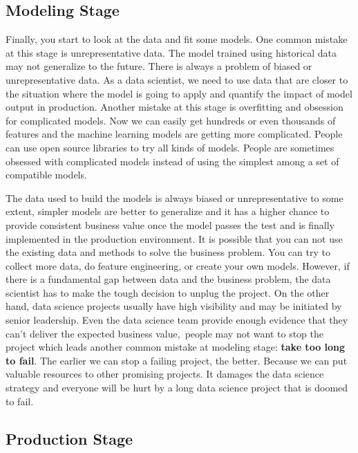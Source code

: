 \documentclass[12pt,]{krantz}
\theoremstyle{definition}
\theoremstyle{definition}
\theoremstyle{definition}
\theoremstyle{remark}
\begin{document}
\subsection{Modeling Stage}\label{modeling-stage}

Finally, you start to look at the data and fit some models. One common
mistake at this stage is unrepresentative data. The model trained using
historical data may not generalize to the future. There is always a
problem of biased or unrepresentative data. As a data scientist, we need
to use data that are closer to the situation where the model is going to
apply and quantify the impact of model output in production. Another
mistake at this stage is overfitting and obsession for complicated
models. Now we can easily get hundreds or even thousands of features and
the machine learning models are getting more complicated. People can use
open source libraries to try all kinds of models. People are sometimes
obsessed with complicated models instead of using the simplest among a
set of compatible models.

The data used to build the models is always biased or unrepresentative
to some extent, simpler models are better to generalize and it has a
higher chance to provide consistent business value once the model passes
the test and is finally implemented in the production environment. It is
possible that you can not use the existing data and methods to solve the
business problem. You can try to collect more data, do feature
engineering, or create your own models. However, if there is a
fundamental gap between data and the business problem, the data
scientist has to make the tough decision to unplug the project. On the
other hand, data science projects usually have high visibility and may
be initiated by senior leadership. Even the data science team provide
enough evidence that they can't deliver the expected business
value,~people may not want to stop the project which leads another
common mistake at modeling stage: \textbf{take too long to fail}. The
earlier we can stop a failing project, the better. Because we can put
valuable resources to other promising projects. It damages the data
science strategy and everyone will be hurt by a long data science
project that is doomed to fail.

\subsection{Production Stage}\label{production-stage}
\end{document}
